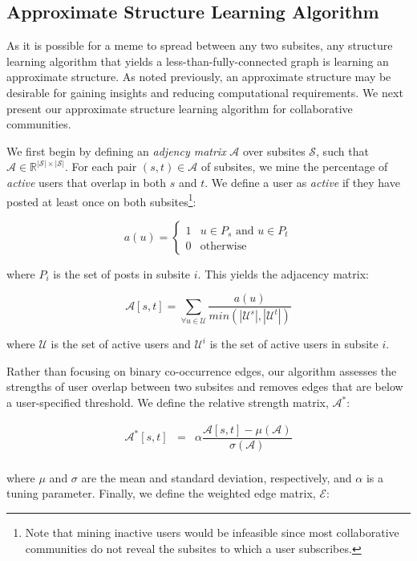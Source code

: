 \documentclass{article} %
\def\R{\mathbb{R}}
\begin{document}
\subsection{Approximate Structure Learning Algorithm}
\label{algorithm}
As it is possible for a meme to spread between any two subsites, any structure learning algorithm that yields a less-than-fully-connected graph is learning an approximate structure. As noted previously, an approximate structure may be desirable for gaining insights and reducing computational requirements. We next present our approximate structure learning algorithm for collaborative communities.

We first begin by defining an \textit{adjency matrix} $\mathcal{A}$ over subsites $\mathcal{S}$, such that $\mathcal{A} \in \R^{|\mathcal{S}|\times|\mathcal{S}|}$. For each pair $(s,t) \in \mathcal{A}$ of subsites, we mine the percentage of \textit{active} users that overlap in both $s$ and $t$. We define a user as \textit{active} if they have posted at least once on both subsites\footnote{Note that mining inactive users would be infeasible since most collaborative communities do not reveal the subsites to which a user subscribes.}:

$$
a(u) = \begin{cases}1&u \in P_s\text{ and }u \in P_t\\0 &\text{otherwise}\end{cases}
$$

where $P_i$ is the set of posts in subsite $i$. This yields the adjacency matrix:

$$
\mathcal{A}[s,t] = \sum_{\forall u \in \mathcal{U}}\dfrac{a(u)}{min(|\mathcal{U}^s|,|\mathcal{U}^t|)}
$$

where $\mathcal{U}$ is the set of active users and $\mathcal{U}^i$ is the set of active users in subsite $i$.

Rather than focusing on binary co-occurrence edges, our algorithm assesses the strengths of user overlap between two subsites and removes edges that are below a user-specified threshold. We define the relative strength matrix, $\mathcal{A}^*$:

$$
\begin{array}{lll}
\mathcal{A}^*[s,t] &=& \alpha \dfrac{\mathcal{A}[s,t] - \mu(\mathcal{A})}{\sigma(\mathcal{A})}\\
\end{array}
$$

where $\mu$ and $\sigma$ are the mean and standard deviation, respectively, and $\alpha$ is a tuning parameter. Finally, we define the weighted edge matrix, $\mathcal{E}$:
\end{document}

